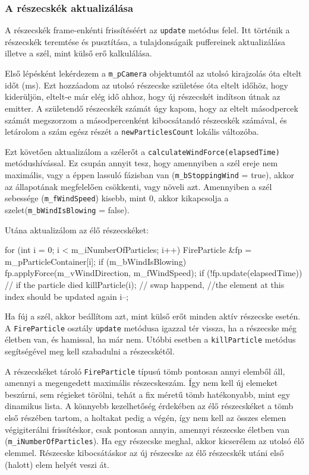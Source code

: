 \subsubsection{A részecskék aktualizálása}
A részecskék frame-enkénti frissítéséért az \texttt{update} metódus felel. Itt történik a részecskék teremtése és pusztítása, a tulajdonságaik puffereinek aktualizálása illetve a szél, mint külső erő kalkulálása.

Első lépésként lekérdezem a \texttt{m\_pCamera} objektumtól az utolsó kirajzolás óta eltelt időt (ms). Ezt hozzáadom az utolsó részecske születése óta eltelt időhöz, hogy kiderüljön, eltelt-e már elég idő ahhoz, hogy új részecskét indítson útnak az emitter. A születendő részecskék számát úgy kapom, hogy az eltelt másodpercek számát megszorzom a másodpercenként kibocsátandó részecskék számával, és letárolom a szám egész részét a \texttt{newParticlesCount} lokális változóba.

Ezt követően aktualizálom a szélerőt a \texttt{calculateWindForce(elapsedTime)} metódushívással. Ez csupán annyit tesz, hogy amennyiben a szél ereje nem maximális, vagy a éppen lassuló fázisban van (\texttt{m\_bStoppingWind} = true), akkor az állapotának megfelelően csökkenti, vagy növeli azt. Amennyiben a szél sebessége (\texttt{m\_fWindSpeed}) kisebb, mint $0$, akkor kikapcsolja a szelet(\texttt{m\_bWindIsBlowing} = false).

Utána aktualizálom az élő részecskéket:
\begin{cpp}
for (int i = 0; i < m_iNumberOfParticles; i++)
{
	FireParticle &fp = m_pParticleContainer[i];
	if (m_bWindIsBlowing) {
		fp.applyForce(m_vWindDirection, m_fWindSpeed);
	}
	if (!fp.update(elapsedTime)) {
		// if the particle died
		killParticle(i);
		// swap happend, 
		//the element at this index should be updated again
		i--;
	}
}
\end{cpp}
Ha fúj a szél, akkor beállítom azt, mint külső erőt minden aktív részecske esetén. A \texttt{FireParticle} osztály \texttt{update} metódusa igazzal tér vissza, ha a részecske még életben van, és hamissal, ha már nem. Utóbbi esetben a \texttt{killParticle} metódus segítségével meg kell szabadulni a részecskétől. 

A részecskéket tároló \texttt{FireParticle} típusú tömb pontosan annyi elemből áll, amennyi a megengedett maximális részecskeszám. Így nem kell új elemeket beszúrni, sem régieket törölni, tehát a fix méretű tömb hatékonyabb, mint egy dinamikus lista. A könnyebb kezelhetőség érdekében az élő részecskéket a tömb első részében tartom, a holtakat pedig a végén, így nem kell az összes elemen végigiterálni frissítéskor, csak pontosan annyin, amennyi részecske életben van (\texttt{m\_iNumberOfParticles}). Ha egy részecske meghal, akkor kicserélem az utolsó élő elemmel. Részecske kibocsátáskor az új részecske az élő részecskék utáni első (halott) elem helyét veszi át. 


